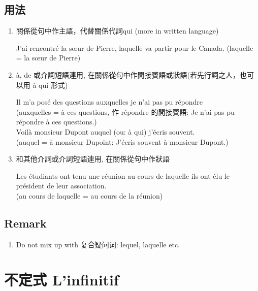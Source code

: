 \documentclass{book}
\begin{document}
        \subsection{用法}
            \begin{enumerate}
                \item 關係從句中作主語，代替關係代詞qui (more in written language)
                    \begin{center}
                        J'ai rencontré la sœur de Pierre, laquelle va partir pour le Canada. (laquelle = la sœur de Pierre)
                    \end{center}
                \item à, de 或介詞短語連用, 在關係從句中作間接賓語或狀語(若先行詞之人，也可以用 à qui 形式)
                    \begin{center}
                        Il m'a posé des questions auxquelles je n'ai pas pu répondre\\
                        (auxquelles = à ces questions, 作 répondre 的間接賓語: Je n'ai pas pu répondre à ces questions.)
                        \\
                        Voilà monsieur Dupont auquel (ou: à qui) j'écris souvent. \\
                        (auquel = à monsieur Dupoint: J'écris souvent à monsieur Dupont.)
                    \end{center}
                \item 和其他介詞或介詞短語連用, 在關係從句中作狀語
                    \begin{center}
                        Les étudiants ont tenu une réunion au cours de laquelle ils ont élu le président de leur association. 
                        \\
                        (au cours de laquelle = au cours de la réunion)
                    \end{center}
            \end{enumerate}

        \subsection{Remark}
            \begin{enumerate}
                \item Do not mix up with 复合疑问词: lequel, laquelle etc.
            \end{enumerate}

    \section{不定式 L'infinitif}
\end{document}
